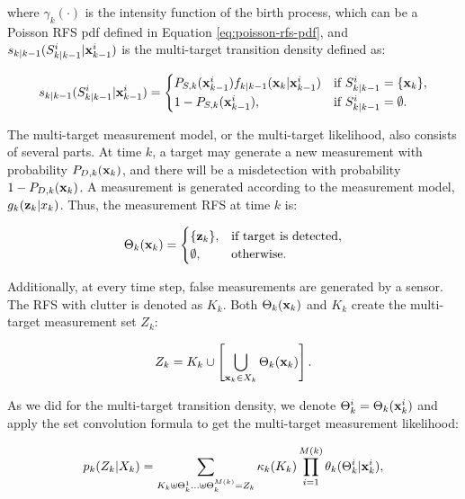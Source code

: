 \noindent where $\gamma_k(\cdot)$ is the intensity function of the birth process, which can be a Poisson RFS pdf defined in Equation \ref{eq:poisson-rfs-pdf}, and $s_{k|k-1}(S_{k|k-1}^i | \svecat{x}{k-1}{i})$ is the multi-target transition density defined as:

\begin{equation}
    s_{k|k-1}(S_{k|k-1}^i | \svecat{x}{k-1}{i}) = \begin{cases}
        P_{S,k}(\svecat{x}{k-1}{i})
            f_{k|k-1}(\vecat{x}{k} | \svecat{x}{k-1}{i}) & \text{if } S_{k|k-1}^i = \{\vecat{x}{k}\}, \\
            1 - P_{S,k}(\svecat{x}{k-1}{i}), & \text{if } S_{k|k-1}^i = \emptyset.
    \end{cases}
\end{equation}

The multi-target measurement model, or the multi-target likelihood, also consists of several parts. At time $k$, a target may generate a new measurement with probability $P_{D,k}(\vecat{x}{k})$, and there will be a misdetection with probability $1 - P_{D,k}(\vecat{x}{k})$. A measurement is generated according to the measurement model, $g_{k}(\vecat{z}{k} | x_{k})$. Thus, the measurement RFS at time $k$ is:

\begin{equation}
    \Theta_k(\vecat{x}{k}) = \begin{cases}
        \{\vecat{z}{k}\}, & \text{if target is detected}, \\
        \emptyset, & \text{otherwise}.
    \end{cases}
\end{equation}

Additionally, at every time step, false measurements are generated by a sensor. The RFS with clutter is denoted as $K_k$. Both $\Theta_k(\vecat{x}{k})$ and $K_k$ create the multi-target measurement set $Z_k$:

\begin{equation}
    Z_k = K_k \cup \left[ \bigcup_{\vecat{x}{k} \in X_k} \Theta_k(\vecat{x}{k}) \right].
\end{equation}

As we did for the multi-target transition density, we denote $\Theta_k^i = \Theta_k(\svecat{x}{k}{i})$ and apply the set convolution formula to get the multi-target measurement likelihood:

\begin{equation}\label{eq:mt-meas-likelihood}
    p_k(Z_k | X_k) = \sum_{
        K_k \uplus \Theta_{k}^1 \ldots \uplus \Theta_{k}^{M(k)} = Z_{k}
    }
    \kappa_k(K_k)
    \prod_{i=1}^{M(k)}
    \theta_{k}(\Theta_{k}^i | \svecat{x}{k}{i}),
\end{equation}

